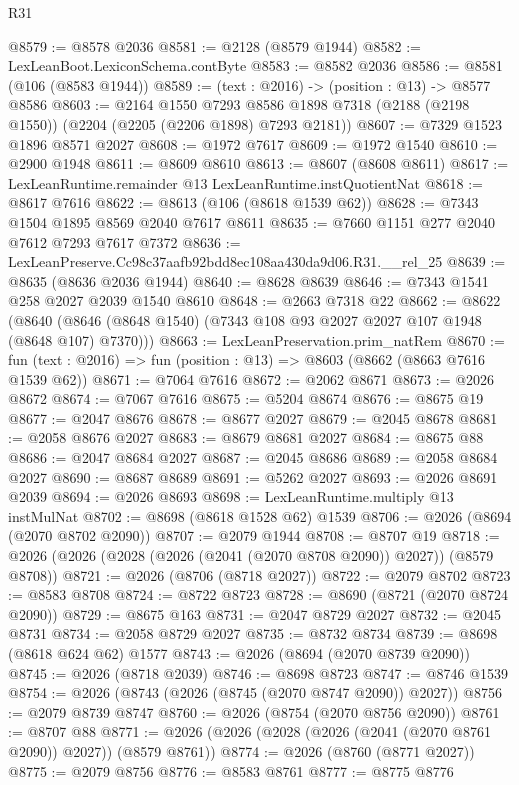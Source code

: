 \begin{lexlean}{R31}
\begin{coremodule}
@8579 := @8578 @2036
@8581 := @2128 (@8579 @1944)
@8582 := LexLeanBoot.LexiconSchema.contByte
@8583 := @8582 @2036
@8586 := @8581 (@106 (@8583 @1944))
@8589 := (text : @2016) -> (position : @13) -> @8577 @8586
@8603 := @2164
    @1550
    @7293
    @8586
    @1898
    @7318
    (@2188 (@2198 @1550))
    (@2204 (@2205 (@2206 @1898) @7293 @2181))
@8607 := @7329 @1523 @1896 @8571 @2027
@8608 := @1972 @7617
@8609 := @1972 @1540
@8610 := @2900 @1948
@8611 := @8609 @8610
@8613 := @8607 (@8608 @8611)
@8617 := LexLeanRuntime.remainder @13 LexLeanRuntime.instQuotientNat
@8618 := @8617 @7616
@8622 := @8613 (@106 (@8618 @1539 @62))
@8628 := @7343 @1504 @1895 @8569 @2040 @7617 @8611
@8635 := @7660 @1151 @277 @2040 @7612 @7293 @7617 @7372
@8636 := LexLeanPreserve.Cc98c37aafb92bdd8ec108aa430da9d06.R31.__rel_25
@8639 := @8635 (@8636 @2036 @1944)
@8640 := @8628 @8639
@8646 := @7343 @1541 @258 @2027 @2039 @1540 @8610
@8648 := @2663 @7318 @22
@8662 := @8622
    (@8640 (@8646 (@8648 @1540) (@7343 @108 @93 @2027 @2027 @107 @1948 (@8648 @107) @7370)))
@8663 := LexLeanPreservation.prim_natRem
@8670 := fun (text : @2016) => fun (position : @13) => @8603 (@8662 (@8663 @7616 @1539 @62))
@8671 := @7064 @7616
@8672 := @2062 @8671
@8673 := @2026 @8672
@8674 := @7067 @7616
@8675 := @5204 @8674
@8676 := @8675 @19
@8677 := @2047 @8676
@8678 := @8677 @2027
@8679 := @2045 @8678
@8681 := @2058 @8676 @2027
@8683 := @8679 @8681 @2027
@8684 := @8675 @88
@8686 := @2047 @8684 @2027
@8687 := @2045 @8686
@8689 := @2058 @8684 @2027
@8690 := @8687 @8689
@8691 := @5262 @2027
@8693 := @2026 @8691 @2039
@8694 := @2026 @8693
@8698 := LexLeanRuntime.multiply @13 instMulNat
@8702 := @8698 (@8618 @1528 @62) @1539
@8706 := @2026 (@8694 (@2070 @8702 @2090))
@8707 := @2079 @1944
@8708 := @8707 @19
@8718 := @2026 (@2026 (@2028 (@2026 (@2041 (@2070 @8708 @2090)) @2027)) (@8579 @8708))
@8721 := @2026 (@8706 (@8718 @2027))
@8722 := @2079 @8702
@8723 := @8583 @8708
@8724 := @8722 @8723
@8728 := @8690 (@8721 (@2070 @8724 @2090))
@8729 := @8675 @163
@8731 := @2047 @8729 @2027
@8732 := @2045 @8731
@8734 := @2058 @8729 @2027
@8735 := @8732 @8734
@8739 := @8698 (@8618 @624 @62) @1577
@8743 := @2026 (@8694 (@2070 @8739 @2090))
@8745 := @2026 (@8718 @2039)
@8746 := @8698 @8723
@8747 := @8746 @1539
@8754 := @2026 (@8743 (@2026 (@8745 (@2070 @8747 @2090)) @2027))
@8756 := @2079 @8739 @8747
@8760 := @2026 (@8754 (@2070 @8756 @2090))
@8761 := @8707 @88
@8771 := @2026 (@2026 (@2028 (@2026 (@2041 (@2070 @8761 @2090)) @2027)) (@8579 @8761))
@8774 := @2026 (@8760 (@8771 @2027))
@8775 := @2079 @8756
@8776 := @8583 @8761
@8777 := @8775 @8776

\end{coremodule}
\end{lexlean}
